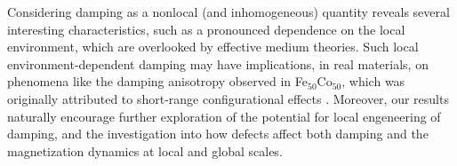 Considering damping as a nonlocal (and inhomogeneous) quantity reveals several interesting characteristics, such as a pronounced dependence on the local environment, which are overlooked by effective medium theories. Such local environment-dependent damping may have implications, in real materials, on phenomena like the damping anisotropy observed in Fe$_{50}$Co$_{50}$, which was originally attributed to short-range configurational effects  \cite{PhysRevLett.122.117203}. Moreover, our results naturally encourage further exploration of the potential for local engeneering of damping, and the investigation into how defects affect both damping and the magnetization dynamics at local and global scales. 

